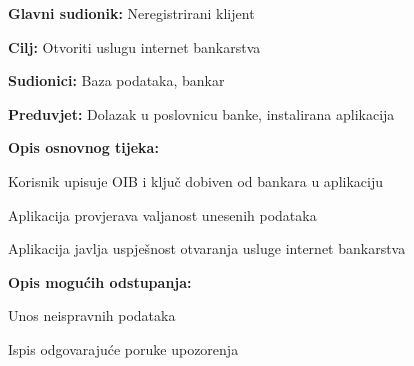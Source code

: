     			
    				\noindent {}
    			\begin{packed_item}
    				
    				\item \textbf{Glavni sudionik: }Neregistrirani klijent
    				\item  \textbf{Cilj:} Otvoriti uslugu internet bankarstva
    				\item  \textbf{Sudionici:} Baza podataka, bankar
    				\item  \textbf{Preduvjet:} Dolazak u poslovnicu banke, instalirana aplikacija
    				\item  \textbf{Opis osnovnog tijeka:}
    				
    				\item[] \begin{packed_enum}
					
					\item Korisnik upisuje OIB i ključ dobiven od bankara u aplikaciju
					\item Aplikacija provjerava valjanost unesenih podataka
					\item Aplikacija javlja uspješnost otvaranja usluge internet bankarstva
					
				\end{packed_enum}
					
						\item  \textbf{Opis mogućih odstupanja:}
					
					\item[] \begin{packed_item}
						
						\item[2.a] Unos neispravnih podataka
						\item[] \begin{packed_enum}
							
							\item Ispis odgovarajuće poruke upozorenja
							
							
						\end{packed_enum}
						
						
					\end{packed_item}
				
										
				
			\end{packed_item}
		

